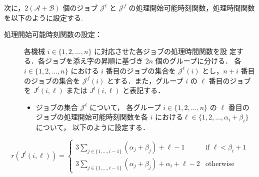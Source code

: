 \documentclass[12pt]{optlab-bachelor}
\begin{document}
次に，$2(\mathcal{A} + \mathcal{B})$ 個のジョブ $\mathcal{J}^t$ と $\mathcal{J}^f$ の処理開始可能時刻関数，処理時間関数を以下のように設定する.
\begin{description}
  \item[処理開始可能時刻関数の設定：] 各機械 $i \in \{1,2,\ldots,n\}$ に対応させた各ジョブの処理時間関数を設
  定する．各ジョブを添え字の昇順に基づき $2n$ 個のグループに分ける． 各 $i
  \in \{1,2,\ldots,n\}$ における $i$ 番目のジョブの集合を
  $\mathcal{J}^t(i)$ とし，$n + i$ 番目のジョブの集合を
  $\mathcal{J}^f(i)$ とする．また，グループ $i$ の $\ell$ 番目のジョブ
  を $J^t(i,\ell)$ または $J^t(i,\ell)$ と表記する．
  \begin{itemize}
    \item ジョブの集合 $\mathcal{J}^t$ について， 各グループ $i \in
    \{1,2,\ldots, n\}$ の $\ell$ 番目のジョブの処理開始可能時刻関数を各
    $i$ における$\ell \in \{1,2,\ldots, \alpha_i + \beta_i\}$ について，
    以下のように設定する．
  \end{itemize}
\end{description}
\begin{displaymath}
  r(J^t(i,\ell)) =
  \left\{ \begin{array}{lll} 3\displaystyle
  \sum_{j \in \{1,\ldots,i - 1\}}(\alpha_j + \beta_j) + \ell - 1 &
  \text{if } \ell < \beta_i + 1 \\ 3 \displaystyle \sum_{j \in \{1,\ldots,i - 1\}}(\alpha_j + \beta_j) + \alpha_i + \ell - 2 & \text{otherwise} \end{array} \right.
\end{displaymath}
\end{document}
